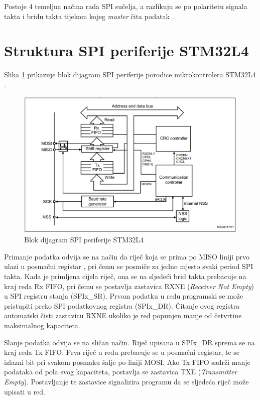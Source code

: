 		Postoje 4 temeljna načina rada  SPI sučelja, a razlikuju se po polaritetu signala takta  i bridu takta tijekom kojeg \textit{master} čita podatak .
		
	\section{Struktura SPI periferije STM32L4}
		Slika \ref{fig:stm32l4_spi} prikazuje blok dijagram SPI periferije porodice mikrokontrolera STM32L4 \cite{stm32l4_manual}.
	
		\begin{figure}[htb]
			\centering
			\includegraphics{slike/STM32L4_SPI_blok_dijagram.png}
			\caption{Blok dijagram SPI periferije STM32L4}
			\label{fig:stm32l4_spi}
		\end{figure}
	
		Primanje podatka odvija se na način da riječ koja se prima po MISO liniji prvo ulazi u posmačni registar , pri čemu se posmiče za jedno mjesto svaki period SPI takta. Kada je primljena cijela riječ, ona se na sljedeći brid takta prebacuje na kraj reda Rx FIFO, pri čemu se postavlja zastavica RXNE (\textit{Receiver Not Empty}) u SPI registru stanja (SPIx\_SR). Prvom podatku u redu programski se može pristupiti preko SPI podatkovnog registra (SPIx\_DR). Čitanje ovog registra automatski čisti zastavicu RXNE ukoliko je red popunjen manje od četvrtine maksimalnog kapaciteta.
		
		Slanje podatka odvija se na sličan način. Riječ upisana u SPIx\_DR sprema se na kraj reda Tx FIFO. Prva riječ u redu prebacuje se u posmačni registar, te se izlazni bit pri svakom posmaku šalje po liniji MOSI. Ako Tx FIFO sadrži manje podataka od pola svog kapaciteta, postavlja se zastavica TXE (\textit{Transmitter Empty}). Postavljanje te zastavice signalizira programu da se sljedeća riječ može upisati u red.
		
